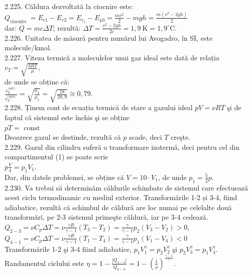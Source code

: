 2.225. Căldura dezvoltată la ciocnire este:\\ $Q_{\text {ciocnire }}=E_{c 1}-E_{c 2}=E_{c_{1}}-E_{p 3}=\frac{m v^{2}}{2}-m g h=\frac{m\left(v^{2}-2 g h\right)}{2}$\\ dar: $Q=m c \Delta T$; rezultã: $\Delta T=\frac{v^{2}-2 g h}{2 c}=1,9 \mathrm{~K}=1,9^{\circ} \mathrm{C}$.\\

2.226. Unitatea de măsură pentru numărul lui Avogadro, în SI, este molecule/kmol.\\

2.227. Viteza termică a moleculelor unui gaz ideal este dată de relația\\ $v_{T}=\sqrt{\frac{3 R T}{\mu}}$,\\ de unde se obține că:\\ $\frac{v_{T}^{\text {(aer) }}}{v_{T}^{\text {(apa) }}}=\sqrt{\frac{\mu_{2}}{\mu_{1}}}=\sqrt{\frac{18}{28,9}} \cong 0,79 .$\\

2.228. Ținem cont de ecuația termică de stare a gazului ideal $p V=\nu R T$ şi de faptul că sistemul este închis şi se obține\\ $p T=\text { const }$\\ Deoarece gazul se destinde, rezultă că $p$ scade, deci $T$ creşte.\\

2.229. Gazul din cilindru suferă o transformare izotermă, deci pentru cel din compartimentul (1) se poate scrie\\ $p \frac{V}{4}=p_{1} V_{1}$.\\ Dar, din datele problemei, se obține că $V=10 \cdot V_{1}$, de unde $p_{1}=\frac{5}{2} p$.\\

2.230. Va trebui să determinăm căldurile schimbate de sistemul care efectuează acest ciclu termodinamic cu mediul exterior. Transformările 1-2 și 3-4, fiind adiabatice, rezultă că schimbul de căldură are loc numai pe celelalte două transformări, pe 2-3 sistemul primeşte căldură, iar pe 3-4 cedează.\\ $Q_{2-3} =\nu C_{p} \Delta T=\nu \frac{\gamma R}{\gamma-1}\left(T_{3}-T_{2}\right)=\frac{\gamma}{\gamma-1} p_{2}\left(V_{3}-V_{2}\right)>0$,\\ $Q_{4-1} =\nu C_{p} \Delta T=\nu \frac{\gamma R}{\gamma-1}\left(T_{1}-T_{4}\right)=\frac{\gamma}{\gamma-1} p_{1}\left(V_{1}-V_{4}\right)<0$\\ Transformările 1-2 şi 3-4 fiind adiabatice, $p_{1} V_{1}^{\gamma}=p_{2} V_{2}^{\gamma}$ şi $p_{2} V_{3}^{\gamma}=p_{1} V_{4}^{\gamma}$.\\ Randamentul ciclului este $\eta=1-\frac{\left|Q_{4-1}\right|}{Q_{2-3}}=1-\left(\frac{1}{\rho}\right)^{\frac{\gamma-1}{\gamma}}$.\\


